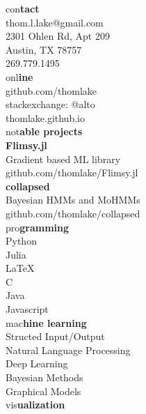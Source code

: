 \documentclass[10pt]{article}
\newcommand{\heada}[1]{\textcolor{shadecolor}{\LARGE{#1}}}
\newcommand{\headb}[1]{\textcolor{shadecolor}{\textbf{\LARGE{#1}}}}
\begin{document}
\vspace{2cm}

\begin{paracol}{2}
\begin{leftcolumn}
    \begin{flushright}
        \heada{con}\headb{tact}\\[0.5cm]
        thom.l.lake@gmail.com\\
        2301 Ohlen Rd, Apt 209\\
        Austin, TX 78757\\
        269.779.1495\\[0.5cm]
        \heada{onl}\headb{ine}\\[0.5cm]
        github.com/thomlake\\
        stackexchange: @alto\\
        thomlake.github.io\\[0.5cm]
        \heada{not}\headb{able projects}\\[0.5cm]
        \textbf{Flimsy.jl} \\
        Gradient based ML library\\
        github.com/thomlake/Flimsy.jl\\[0.25cm]
        \textbf{collapsed} \\
        Bayesian HMMs and MoHMMs\\
        github.com/thomlake/collapsed\\[0.5cm]
        \heada{pro}\headb{gramming}\\[0.5cm]
        Python\\[0.0cm]
        Julia\\
        \LaTeX\\
        C\\
        Java\\
        Javascript\\[0.5cm]
        \heada{mac}\headb{hine learning}\\[0.5cm]
        Structed Input\;/\;Output\\
        Natural Language Processing\\
        Deep Learning\\
        Bayesian Methods\\
        Graphical Models\\[0.5cm]
        \heada{vis}\headb{ualization}\\[0.5cm]

\end{flushright}
\end{leftcolumn}
\end{paracol}
\end{document}
